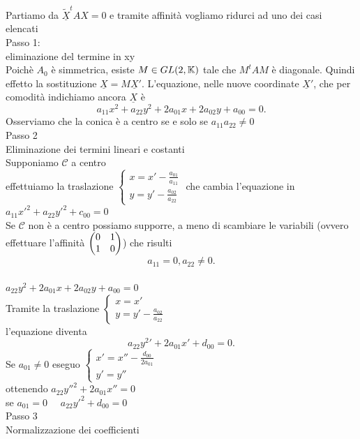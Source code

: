\documentclass[12px]{article}
\begin{document}
	\begin{dimo}
		Partiamo da $\underline{\widetilde{X}}^t A X = 0$ e tramite affinità vogliamo ridurci ad uno dei casi elencati\\
		Passo 1:\\
		eliminazione del termine in xy \\ 
		Poichè $A_0$ è simmetrica, esiste $M\in GL(2,\mathbb{K})$ tale che $M^t AM$ è diagonale. Quindi effetto la sostituzione $\underline X = M\underline X '$. L'equazione, nelle nuove coordinate $\underline X'$, che per comodità indichiamo ancora $\underline X$ è 
		\[
		a_{11}x^2 + a_{22}y^2 + 2a_{01}x + 2a_{02}y + a_00 = 0
		.\] 
		Osserviamo che la conica è a centro se e solo se $a_{11}a_{22}\neq 0$\\
		Passo 2\\
		Eliminazione dei termini lineari e costanti\\
		Supponiamo $\mathscr{C}$ a centro \\
		effettuiamo la traslazione $\begin{cases}
			x = x' - \frac {a_{01}}{a_{11}}\\
			y = y' - \frac{a_{02}}{a_{22}}
		\end{cases}$
		che cambia l'equazione in 
		$a_11 x'^2 + a_{22}y'^2 + c_00 = 0$\\
		Se $\mathscr{C}$ non è a centro possiamo supporre, a meno di scambiare le variabili (ovvero effettuare l'affinità $\begin{pmatrix}0&1\\1&0\end{pmatrix}$) che risulti\\
		 \[
		a_11 =0, a_{22}\neq 0
		.\] \\
		$a_{22}y^2 + 2a_{01}x + 2a_{02}y + a_{00} =0 $\\
		Tramite la traslazione $ \begin{cases}
			x = x'\\
			y = y'-\frac {a_{02}}{a_{22}}
		\end{cases}$ \\
		l'equazione diventa
		\[
		a_22y^2' + 2a_{01}x' + d_{00}=0
		.\] 
		Se $a_{01}\neq 0$ eseguo $ \begin{cases}
			x' = x'' - \frac {d_{00}}{2a_{01}}\\
			y' = y''
		\end{cases}$\\
		ottenendo $a_{22} y''^2 + 2 a_{01}x''=0$\\
		se $a_{01} = 0$ \  \ $a_{22} y'^2 + d_{00}=0$\\
		Passo 3\\
		Normalizzazione dei coefficienti \\

\end{dimo}
\end{document}

